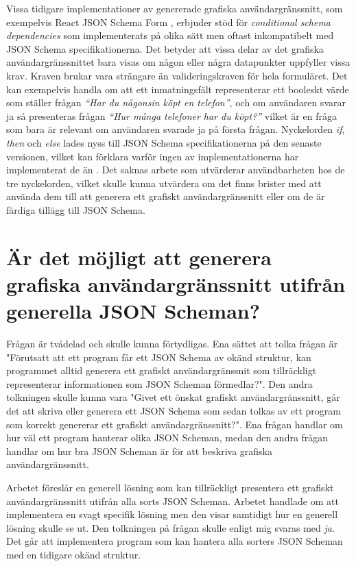 Vissa tidigare implementationer av genererade grafiska användargränssnitt, som exempelvis React JSON Schema Form \cite{MozillaServices}, erbjuder stöd för \textit{conditional schema dependencies} som implementerats på olika sätt men oftast inkompatibelt med JSON Schema specifikationerna. Det betyder att vissa delar av det grafiska användargränssnittet bara visas om någon eller några datapunkter uppfyller vissa krav. Kraven brukar vara strängare än valideringskraven för hela formuläret. Det kan exempelvis handla om att ett inmatningsfält representerar ett booleskt värde som ställer frågan \textit{``Har du någonsin köpt en telefon''}, och om användaren svarar ja så presenteras frågan \textit{``Hur många telefoner har du köpt?''} vilket är en fråga som bara är relevant om användaren svarade ja på första frågan. Nyckelorden \textit{if}, \textit{then} och \textit{else} lades nyss till JSON Schema specifikationerna på den senaste versionen, vilket kan förklara varför ingen av implementationerna har implementerat de än \cite{Andrews2018}. Det saknas arbete som utvärderar användbarheten hos de tre nyckelorden, vilket skulle kunna utvärdera om det finns brister med att använda dem till att generera ett grafiskt användargränssnitt eller om de är färdiga tillägg till JSON Schema.

\section{Är det möjligt att generera grafiska användargränssnitt utifrån generella JSON Scheman?}

Frågan är tvådelad och skulle kunna förtydligas. Ena sättet att tolka frågan är "Förutsatt att ett program får ett JSON Schema av okänd struktur, kan programmet alltid generera ett grafiskt användargränssnit som tillräckligt representerar informationen som JSON Scheman förmedlar?". Den andra tolkningen skulle kunna vara "Givet ett önskat grafiskt användargränssnitt, går det att skriva eller generera ett JSON Schema som sedan tolkas av ett program som korrekt genererar ett grafiskt användargränssnitt?". Ena frågan handlar om hur väl ett program hanterar olika JSON Scheman, medan den andra frågan handlar om hur bra JSON Scheman är för att beskriva grafiska användargränssnitt.

Arbetet föreslår en generell lösning som kan tillräckligt presentera ett grafiskt användargränssnitt utifrån alla sorts JSON Scheman. Arbetet handlade om att implementera en svagt specifik lösning men den visar samtidigt hur en generell lösning skulle se ut. Den tolkningen på frågan skulle enligt mig svaras med \textit{ja}. Det går att implementera program som kan hantera alla sorters JSON Scheman med en tidigare okänd struktur.

